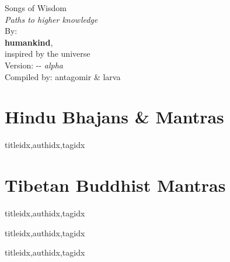 \documentclass[twoside,10pt]{book}
\begin{document}
  \begin{titlepage}
    
    \thispagestyle{empty}
    \vspace*{\fill}    
    \begin{center}
      \Huge Songs of Wisdom\\
      \normalsize \textit{Paths to higher knowledge}\\
      \Large
      \vspace{3em}
      By:\\
      \textbf{humankind},\\
      inspired by the universe \\
      \vspace{1em}
      Version: \the\year-\the\month-\the\day \textit{ alpha}
      \\
      \vspace*{\fill}
      \let\thefootnote\relax{\scriptsize Compiled by: antagomir \& larva}
    \end{center}    
  \end{titlepage}
  
  \tableofcontents %

  \clearpage\scleardpage
    \section{Hindu Bhajans \& Mantras} 
      \begin{songs}{titleidx,authidx,tagidx}
        \setcounter{songnum}{100}
        
      \end{songs}
     \scleardpage
    \section{Tibetan Buddhist Mantras}
      \begin{songs}{titleidx,authidx,tagidx}
        \setcounter{songnum}{170}
        
      \end{songs}  
  
  \clearpage\scleardpage
    \begin{songs}{titleidx,authidx,tagidx}
      \setcounter{songnum}{200}
      
    \end{songs}
    
  \clearpage\scleardpage    
    \begin{songs}{titleidx,authidx,tagidx}
      \setcounter{songnum}{300}
      
    \end{songs}
  
\end{document}
